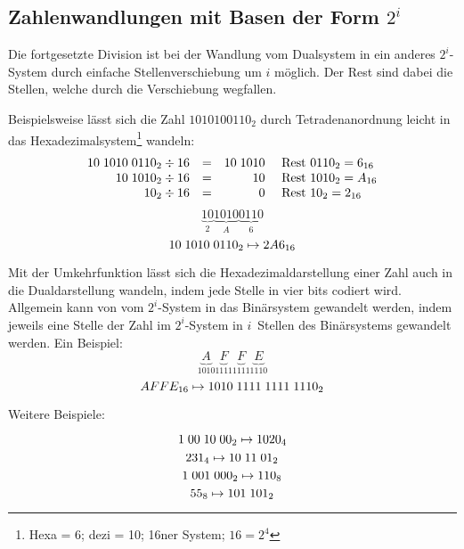 \subsection{Zahlenwandlungen mit Basen der Form $2^i$}
Die fortgesetzte Division ist bei der Wandlung vom Dualsystem in ein anderes $2^i$-System durch einfache Stellenverschiebung um $i$ möglich. Der Rest sind dabei die Stellen, welche durch die Verschiebung wegfallen.

Beispielsweise lässt sich die Zahl $1010100110_2$ durch Tetradenanordnung leicht in das Hexadezimalsystem\footnote{Hexa = 6; dezi = 10; 16ner System; $16 = 2^4$} wandeln:
$$
\begin{array}{rrrl}
	10\hspace{1mm}1010\hspace{1mm}0110_2 \div 16 & = & 10\hspace{1mm}1010 
		& \textnormal{ Rest } 0110_2 = 6_{16} \\
	10\hspace{1mm}1010_2 \div 16 & = & 10 
		& \textnormal{ Rest } 1010_2 = A_{16} \\
	10_2 \div 16 & = & 0 
		& \textnormal{ Rest } 10_2 = 2_{16} \\
\end{array}
$$
$$
	\underbrace{10}_{2} \underbrace{1010}_{A} \underbrace{0110}_{6}
$$
$$
	10\hspace{1mm}1010\hspace{1mm}0110_2 \mapsto 2A6_{16}
$$

Mit der Umkehrfunktion lässt sich die Hexadezimaldarstellung einer Zahl auch in die Dualdarstellung wandeln, indem jede Stelle in vier bits codiert wird. Allgemein kann von vom $2^i$-System in das Binärsystem gewandelt werden, indem jeweils eine Stelle der Zahl im $2^i$-System in $i$~Stellen des Binärsystems gewandelt werden. Ein Beispiel:
$$
	\underbrace{A}_{1010} \underbrace{F}_{1111} \underbrace{F}_{1111} \underbrace{E}_{1110}
$$
$$
	AFFE_{16} \mapsto 1010\hspace{1mm}1111\hspace{1mm}1111\hspace{1mm}1110_2
$$

\begin{center}
Weitere Beispiele:
\end{center}
$$ 1\hspace{1mm}00\hspace{1mm}10\hspace{1mm}00_2 \mapsto 1020_4 $$
$$ 231_4 \mapsto 10\hspace{1mm}11\hspace{1mm}01_2 $$
$$ 1\hspace{1mm}001\hspace{1mm}000_2 \mapsto 110_8 $$
$$ 55_8 \mapsto 101\hspace{1mm}101_2 $$

